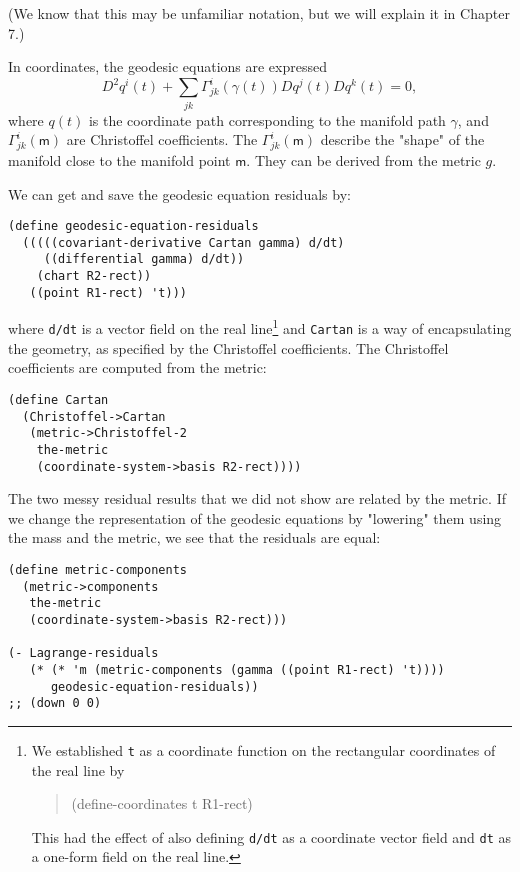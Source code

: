 \documentclass[11pt]{article}
\begin{document}
(We know that this may be unfamiliar notation, but we will explain it in
Chapter 7.)

In coordinates, the geodesic equations are expressed
\begin{equation}
D^{2} q^{i}(t)+\sum_{j k} \Gamma_{j k}^{i}(\gamma(t)) D q^{j}(t) D q^{k}(t)=0,
\end{equation}
where \(q(t)\) is the coordinate path corresponding to the manifold path
\(\gamma\), and \(\Gamma^i_{jk}\left(\mathsf{m}\right)\) are Christoffel
coefficients. The \(\Gamma^i_{jk}\left(\mathsf{m}\right)\) describe the "shape"
of the manifold close to the manifold point \(\mathsf{m}\). They can be derived
from the metric \(g\).

We can get and save the geodesic equation residuals by:

\begin{verbatim}
(define geodesic-equation-residuals
  (((((covariant-derivative Cartan gamma) d/dt)
     ((differential gamma) d/dt))
    (chart R2-rect))
   ((point R1-rect) 't)))
\end{verbatim}

where \texttt{d/dt} is a vector field on the real line\footnote{We established \texttt{t} as a coordinate function on the rectangular
coordinates of the real line by

\begin{quote}
(define-coordinates t R1-rect)
\end{quote}

This had the effect of also defining \texttt{d/dt} as a coordinate vector field and
\texttt{dt} as a one-form field on the real line.} and \texttt{Cartan} is a way
of encapsulating the geometry, as specified by the Christoffel coefficients.
The Christoffel coefficients are computed from the metric:

\begin{verbatim}
(define Cartan
  (Christoffel->Cartan
   (metric->Christoffel-2
    the-metric
    (coordinate-system->basis R2-rect))))
\end{verbatim}

The two messy residual results that we did not show are related by the
metric. If we change the representation of the geodesic equations by
"lowering" them using the mass and the metric, we see that the residuals are
equal:

\begin{verbatim}
(define metric-components
  (metric->components
   the-metric
   (coordinate-system->basis R2-rect)))

(- Lagrange-residuals
   (* (* 'm (metric-components (gamma ((point R1-rect) 't))))
      geodesic-equation-residuals))
;; (down 0 0)
\end{verbatim}
\end{document}
